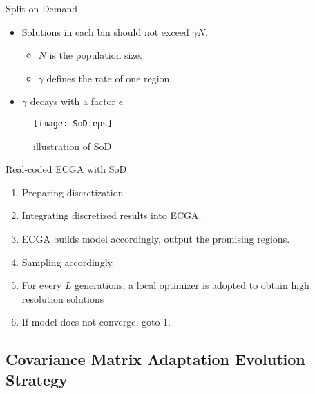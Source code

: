 \begin{frame}{Split on Demand}
  \begin{itemize}
    \item Solutions in each bin should not exceed $\gamma N$.
      \begin{itemize}
        \item $N$ is the population size.
        \item $\gamma$ defines the rate of one region.
      \end{itemize}
    \item $\gamma$ decays with a factor $\epsilon$.
  \end{itemize}
  \begin{figure}
    \centering
    \texttt{[image: SoD.eps]}
    \caption{illustration of SoD}
  \end{figure}
\end{frame}

\begin{frame}{Real-coded ECGA with SoD}
  \pause
  \begin{enumerate}
    \item Preparing discretization\pause
      \vspace*{14pt}
    \item Integrating discretized results into ECGA.\pause
      \vspace*{14pt}
    \item ECGA builds model accordingly, output the promising
      regions.\pause
      \vspace*{14pt}
    \item Sampling accordingly.\pause
      \vspace*{14pt}
    \item For every $L$ generations, a local optimizer is adopted to
      obtain high resolution solutions\pause
      \vspace*{14pt}
    \item If model does not converge, goto 1.
  \end{enumerate}
\end{frame}

\subsection{Covariance Matrix Adaptation Evolution Strategy}


